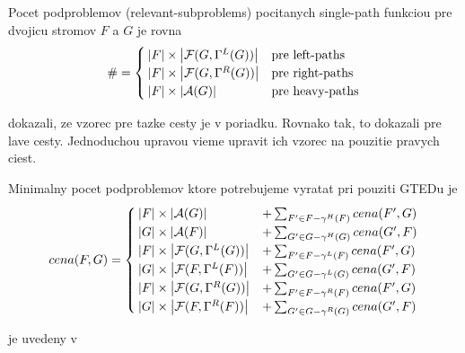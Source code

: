 \begin{lemma}
  Pocet podproblemov (relevant-subproblems) pocitanych single-path funkciou pre dvojicu
  stromov $F$ a $G$ je rovna
  \begin{align*}
    \# = 
    \begin{cases}
      \left|{F}\right| \times \left|{\mathcal{F}(G, \Gamma^{L}(G))}\right| & \text{pre left-paths}
      \\
      \left|{F}\right| \times \left|{\mathcal{F}(G, \Gamma^{R}(G))}\right| & \text{pre right-paths}
      \\
      \left|{F}\right| \times \left|{\mathcal{A}(G)}\right| & \text{pre heavy-paths}
    \end{cases}
  \end{align*}
\end{lemma}

\begin{dukaz}
  \citet{DMRW} dokazali, ze vzorec pre tazke cesty je v poriadku. Rovnako tak,
  \citet{ZHANGSHASHA} to dokazali pre lave cesty. Jednoduchou upravou vieme upravit
  ich vzorec na pouzitie pravych ciest.
\end{dukaz}

\begin{definice}
  Minimalny pocet podproblemov ktore potrebujeme vyratat pri pouziti GTEDu je
  \begin{align*}
    cena(F, G) =
    \begin{cases}
      \left|{F}\right| \times \left|{\mathcal{A}(G)}\right| &+ \sum_{{F}' \in F - \gamma^{H}(F)}cena({F}', G)
      \\
      \left|{G}\right| \times \left|{\mathcal{A}(F)}\right| &+ \sum_{{G}' \in G - \gamma^{H}(G)}cena({G}', F)
      \\
      \left|{F}\right| \times \left|{\mathcal{F}(G, \Gamma^{L}(G))}\right| &+ \sum_{{F}' \in F - \gamma^{L}(F)}cena({F}', G)
      \\
      \left|{G}\right| \times \left|{\mathcal{F}(F, \Gamma^{L}(F))}\right| &+ \sum_{{G}' \in G - \gamma^{L}(G)}cena({G}', F)
      \\
      \left|{F}\right| \times \left|{\mathcal{F}(G, \Gamma^{R}(G))}\right| &+ \sum_{{F}' \in F - \gamma^{R}(F)}cena({F}', G)
      \\
      \left|{G}\right| \times \left|{\mathcal{F}(F, \Gamma^{R}(F))}\right| &+ \sum_{{G}' \in G - \gamma^{R}(G)}cena({G}', F)
    \end{cases}
  \end{align*}
\end{definice}

\begin{dukaz}
  je uvedeny v \citet{RTED}
\end{dukaz}

